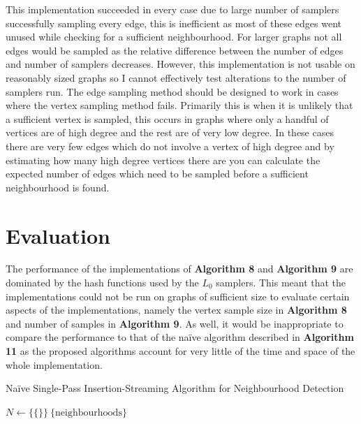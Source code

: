\documentclass[11pt,twoside,a4paper]{report}
\begin{document}
\par This implementation succeeded in every case due to large number of samplers successfully sampling every edge, this is inefficient as most of these edges went unused while checking for a sufficient neighbourhood. For larger graphs not all edges would be sampled as the relative difference between the number of edges and number of samplers decreases. However, this implementation is not usable on reasonably sized graphs so I cannot effectively test alterations to the number of samplers run. The edge sampling method should be designed to work in cases where the vertex sampling method fails. Primarily this is when it is unlikely that a sufficient vertex is sampled, this occurs in graphs where only a handful of vertices are of high degree and the rest are of very low degree. In these cases there are very few edges which do not involve a vertex of high degree and by estimating how many high degree vertices there are you can calculate the expected number of edges which need to be sampled before a sufficient neighbourhood is found.

\section{Evaluation}

The performance of the implementations of \textbf{Algorithm 8} and \textbf{Algorithm 9} are dominated by the hash functions used by the $L_0$ samplers. This meant that the implementations could not be run on graphs of sufficient size to evaluate certain aspects of the implementations, namely the vertex sample size in \textbf{Algorithm 8} and number of samples in \textbf{Algorithm 9}. As well, it would be inappropriate to compare the performance to that of the naïve algorithm described in \textbf{Algorithm 11} as the proposed algorithms account for very little of the time and space of the whole implementation.

\begin{algorithm}[H]
\caption{Na\"ive Single-Pass Insertion-Streaming Algorithm for Neighbourhood Detection}
$N\leftarrow\{\{\}\}\ \{\text{neighbourhoods}\}$\\
 {
}
\end{algorithm}
\end{document}
